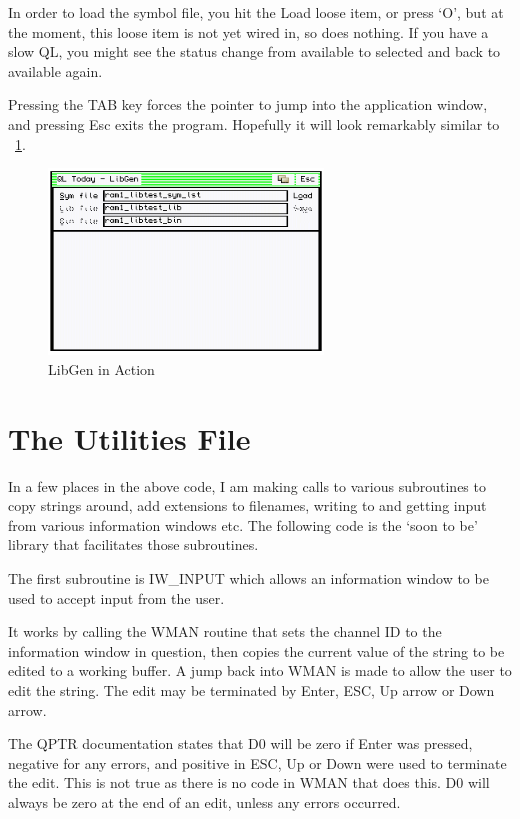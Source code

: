 In order to load the symbol file, you hit the Load loose item, or
    press `O', but at the moment, this loose item is not yet wired in, so does
    nothing. If you have a slow QL, you might see the status change from
    available to selected and back to available again.

Pressing the TAB key forces the pointer to jump into the application
    window, and pressing Esc exits the program. Hopefully it will look
    remarkably similar to \figurename~\ref{fig:LibGenInAction}.

\begin{figure}[h]
\center
\includegraphics[width=0.65\textwidth]{Content/images/libgen_2.png}
\caption{LibGen in Action}
\label{fig:LibGenInAction}
\end{figure}


\section{The Utilities File}

In a few places in the above code, I am making calls to various
    subroutines to copy strings around, add extensions to filenames, writing
    to and getting input from various information windows etc. The following
    code is the `soon to be' library that facilitates those
    subroutines.

The first subroutine is IW\_INPUT which allows
    an information window to be used to accept input from the user.

It works by calling the WMAN routine that sets the channel ID to the
    information window in question, then copies the current value of the
    string to be edited to a working buffer. A jump back into WMAN is made to
    allow the user to edit the string. The edit may be terminated by Enter,
    ESC, Up arrow or Down arrow.

The QPTR documentation states that D0 will be zero if Enter was
    pressed, negative for any errors, and positive in ESC, Up or Down were
    used to terminate the edit. This is not true as there is no code in WMAN
    that does this. D0 will always be zero at the end of an edit, unless any
    errors occurred.

